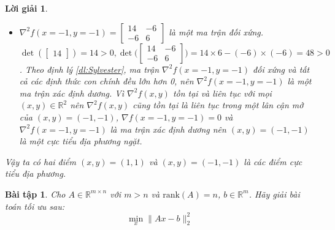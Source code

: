 \documentclass[14pt, a4paper]{article}
\theoremstyle{sltheorem}
\newtheorem{baitap}{Bài tập}
\theoremstyle{soltheorem}
\newtheorem*{loigiai}{Lời giải}
\begin{document}
\begin{loigiai}
\begin{itemize}
            Theo định lý \ref{dl:Sylvester}, ma trận $\nabla^2 f(x=1,y=1)$ đối xứng và tất cả các định thức con chính đều lớn hơn 0, nên $\nabla^2 f(x=1,y=1)$ là một ma trận xác định dương.
            Vì $\nabla^2 f(x, y)$ tồn tại và liên tục với mọi $(x, y) \in \mathbb{R}^2$ nên $\nabla^2 f(x, y)$ cũng tồn tại là liên tục trong một lân cận mở của $(x,y)=(1,1)$, $\nabla f(x=1,y=1)=0$ và $\nabla^2 f(x=1,y=1)$ là ma trận xác định dương nên $(x,y)=(1,1)$ là một cực tiểu địa phương ngặt.
            \item $\nabla^2 f(x=-1,y=-1)=\begin{bmatrix} 14 & -6 \\ -6 & 6 \end{bmatrix}$ là một ma trận đối xứng. $\det{(\begin{bmatrix}14\end{bmatrix})}=14>0, \det{\Big(\begin{bmatrix} 14 & -6 \\ -6 & 6 \end{bmatrix}\Big)}=14\times6 - (-6)\times(-6)=48>0$.
            Theo định lý \ref{dl:Sylvester}, ma trận $\nabla^2 f(x=-1,y=-1)$ đối xứng và tất cả các định thức con chính đều lớn hơn 0, nên $\nabla^2 f(x=-1,y=-1)$ là một ma trận xác định dương.
            Vì $\nabla^2 f(x, y)$ tồn tại và liên tục với mọi $(x, y) \in \mathbb{R}^2$ nên $\nabla^2 f(x, y)$ cũng tồn tại là liên tục trong một lân cận mở của $(x,y)=(-1,-1)$, $\nabla f(x=-1,y=-1)=0$ và $\nabla^2 f(x=-1,y=-1)$ là ma trận xác định dương nên $(x,y)=(-1,-1)$ là một cực tiểu địa phương ngặt.
        \end{itemize}
        Vậy ta có hai điểm $(x,y)=(1, 1)$ và $(x,y)=(-1,-1)$ là các điểm cực tiểu địa phương.
    \end{loigiai}

    \begin{baitap}
        Cho $A \in \mathbb{R}^{m \times n}$ với $m > n$ và $\mathrm{rank}(A)=n$, $b \in \mathbb{R}^{m}$. Hãy giải bài toán tối ưu sau:
        \begin{equation*}
            \min_x \lVert Ax - b \rVert_2^2
        \end{equation*}
    \end{baitap}
\end{document}
